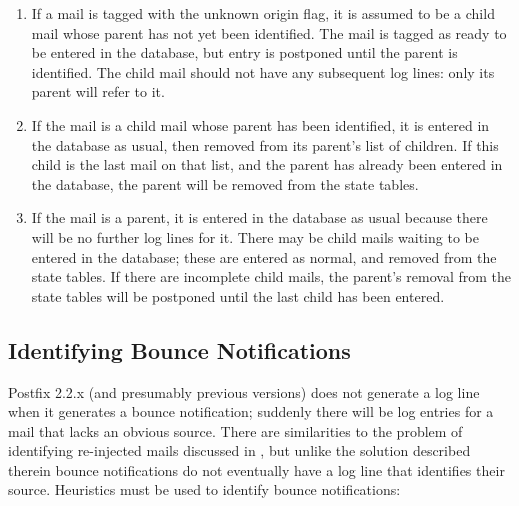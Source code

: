 \begin{enumerate}

    \item If a mail is tagged with the unknown origin flag, it is assumed
        to be a child mail whose parent has not yet been identified.  The
        mail is tagged as ready to be entered in the database, but entry is
        postponed until the parent is identified.  The child mail should
        not have any subsequent log lines: only its parent will refer to
        it.

    \item If the mail is a child mail whose parent has been identified, it
        is entered in the database as usual, then removed from its parent's
        list of children.  If this child is the last mail on that list, and
        the parent has already been entered in the database, the parent
        will be removed from the state tables.

    \item If the mail is a parent, it is entered in the database as usual
        because there will be no further log lines for it.  There may be
        child mails waiting to be entered in the database; these are
        entered as normal, and removed from the state tables.  If there are
        incomplete child mails, the parent's removal from the state tables
        will be postponed until the last child has been entered.

\end{enumerate}

\subsection{Identifying Bounce Notifications}

\label{identifying bounce notifications}

Postfix 2.2.x (and presumably previous versions) does not generate a log
line when it generates a bounce notification; suddenly there will be log
entries for a mail that lacks an obvious source.  There are similarities to
the problem of identifying re-injected mails discussed in
, but unlike the solution described
therein bounce notifications do not eventually have a log line that
identifies their source.  Heuristics must be used to identify bounce
notifications:

